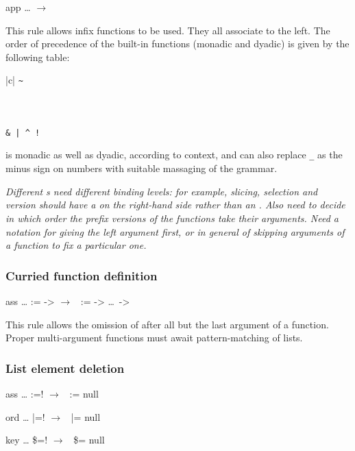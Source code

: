 \documentclass[english]{article}
\newcommand{\cont}{\noindent}
\newcommand{\goesto}{\ensuremath{\longrightarrow}}
\begin{document}
\begin{bnfc}
\item[app]\dots\Alt{}   \goesto\
  
\end{bnfc}

\cont This rule allows infix functions to be used. They all associate to the left. The order of precedence of the built-in functions (monadic and dyadic) is given by the following table:

\begin{mytabular}{|c|}
\verb|~| \\
\conc{+ -} \\
\conc{* / \%} \\
\conc{= < >} \\
\verb_& | ^ !_\\
\end{mytabular}

\cont \conc{-} is monadic as well as dyadic, according to context, and can also replace \verb|_| as the minus sign on numbers with suitable massaging of the grammar.

\emph{Different s need different binding levels: for example, slicing, selection and version should have a  on the right-hand side rather than an . Also need to decide in which order the prefix versions of the functions take their arguments. Need a notation for giving the left argument first, or in general of skipping arguments of a function to fix a particular one.}

\subsubsection{Curried function definition}

\begin{bnfc}
\item[ass]\dots\Alt{} :=  ->  \goesto\  :=  -> \dots\ -> 
\end{bnfc}

\cont This rule allows the omission of \nont{->} after all but the last argument of a function. Proper multi-argument functions must await pattern-matching of lists.

\subsubsection{List element deletion}

\begin{bnfc}
\item[ass]\dots\Alt{} :=! \goesto\  := null
\item[ord]\dots\Alt{} |=! \goesto\  |= null
\item[key]\dots\Alt\nont{exp} \$=! \goesto\ \nont{exp} \$= null
\end{bnfc}
\end{document}
